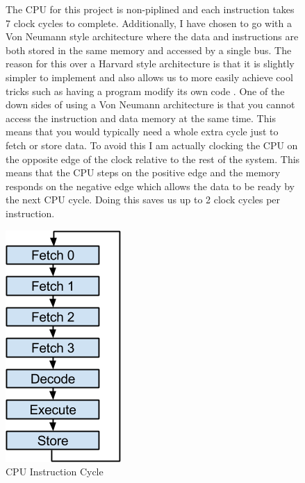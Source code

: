 \documentclass[10pt]{article}
\begin{document}
        \begin{figure}[H]
            \centering
            \begin{minipage}[t]{.7\textwidth}
                \vspace{0pt}
                The CPU for this project is non-piplined and each instruction
                takes 7 clock cycles to complete.  Additionally, I have chosen
                to go with a Von Neumann style architecture \cite{von} where
                the data and instructions are both stored in the same memory
                and accessed by a single bus. The reason for this over a
                Harvard style architecture \cite{harvard} is that it is
                slightly simpler to implement and also allows us to more easily
                achieve cool tricks such as having a program modify its own
                code \cite{modify}. One of the down sides of using a Von
                Neumann architecture is that you cannot access the instruction
                and data memory at the same time. This means that you would
                typically need a whole extra cycle just to fetch or store data.
                To avoid this I am actually clocking the CPU on the opposite
                edge of the clock relative to the rest of the system.  This
                means that the CPU steps on the positive edge and the memory
                responds on the negative edge which allows the data to be ready
                by the next CPU cycle. Doing this saves us up to 2 clock cycles
                per instruction.
            \end{minipage}%
            \begin{minipage}[t]{.3\textwidth}
                \vspace{0pt}
                \centering
                \includegraphics[width=0.5\linewidth]{./instruction_cycle.png}
                \caption{CPU Instruction Cycle}
            \end{minipage}
        \end{figure}
\end{document}
